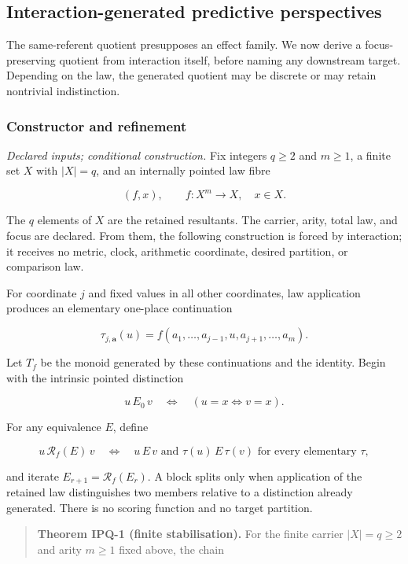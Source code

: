 \documentclass[11pt,a4paper]{article}
\begin{document}
\subsection{Interaction-generated predictive
perspectives}

The same-referent quotient presupposes an effect family. We now derive a
focus-preserving quotient from interaction itself, before naming any
downstream target. Depending on the law, the generated quotient may be
discrete or may retain nontrivial indistinction.

\subsubsection{Constructor and
refinement}

\emph{Declared inputs; conditional construction.} Fix integers
\(q \geq 2\) and \(m \geq 1\), a finite set \(X\) with \(|X| = q\), and
an internally pointed law fibre

\[(f,x),\quad\quad f:X^{m} \rightarrow X,\quad x \in X.\]

The \(q\) elements of \(X\) are the retained resultants. The carrier,
arity, total law, and focus are declared. From them, the following
construction is forced by interaction; it receives no metric, clock,
arithmetic coordinate, desired partition, or comparison law.

For coordinate \(j\) and fixed values in all other coordinates, law
application produces an elementary one-place continuation

\[\tau_{j,\mathbf{a}}(u) = f\left( a_{1},\ldots,a_{j - 1},u,a_{j + 1},\ldots,a_{m} \right).\]

Let \(T_{f}\) be the monoid generated by these continuations and the
identity. Begin with the intrinsic pointed distinction

\[u\, E_{0}\, v\quad \Leftrightarrow \quad(u = x \Leftrightarrow v = x).\]

For any equivalence \(E\), define

\[u\,\mathcal{R}_{f}(E)\, v\quad \Leftrightarrow \quad u\, E\, v\text{ and }\tau(u)\, E\,\tau(v)\text{ for every elementary }\tau,\]

and iterate \(E_{r + 1} = \mathcal{R}_{f}\left( E_{r} \right)\). A block
splits only when application of the retained law distinguishes two
members relative to a distinction already generated. There is no scoring
function and no target partition.

\begin{quote}
\textbf{Theorem IPQ-1 (finite stabilisation).} For the finite carrier
\(|X| = q \geq 2\) and arity \(m \geq 1\) fixed above, the chain
\end{quote}
\end{document}
